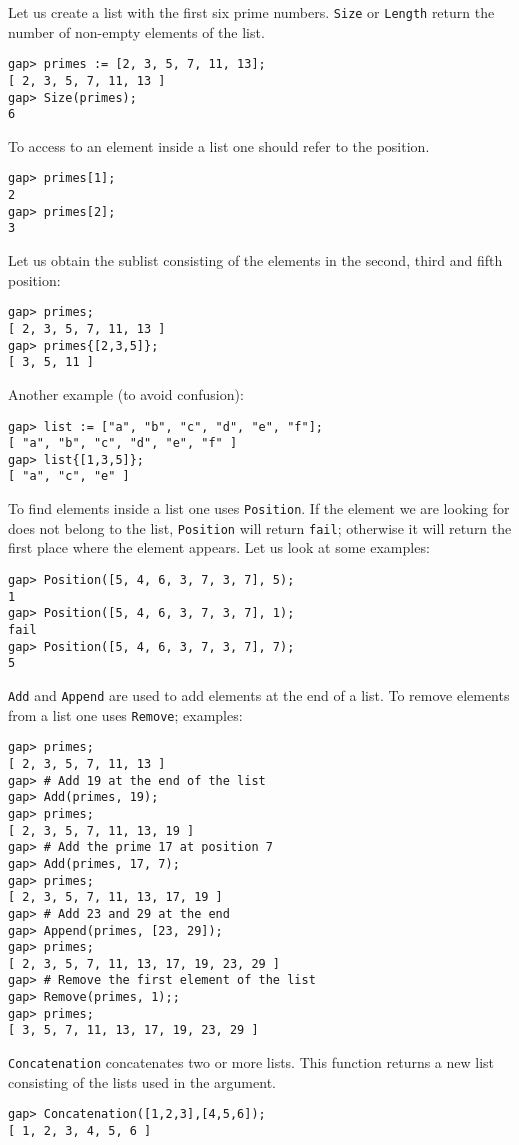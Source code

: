 \begin{example}
Let us create a list with the first six prime numbers. \lstinline{Size} or
\lstinline{Length} return the number of non-empty elements of the list. 
\begin{lstlisting}
gap> primes := [2, 3, 5, 7, 11, 13];
[ 2, 3, 5, 7, 11, 13 ]
gap> Size(primes);
6
\end{lstlisting}
To access to an element inside a list one should refer to the position. 
\begin{lstlisting}
gap> primes[1];
2
gap> primes[2];
3
\end{lstlisting}
Let us obtain the sublist consisting of the elements in the second, third and
fifth position:
\begin{lstlisting}
gap> primes;
[ 2, 3, 5, 7, 11, 13 ]
gap> primes{[2,3,5]};
[ 3, 5, 11 ]
\end{lstlisting}
Another example (to avoid confusion):
\begin{lstlisting}
gap> list := ["a", "b", "c", "d", "e", "f"];
[ "a", "b", "c", "d", "e", "f" ]
gap> list{[1,3,5]};
[ "a", "c", "e" ]
\end{lstlisting}
To find elements inside a list one uses \lstinline{Position}. If the element we
are looking for does not belong to the list, \lstinline{Position} will return
\lstinline{fail}; otherwise it will return the first place where the element
appears. Let us look at some examples:
\begin{lstlisting}
gap> Position([5, 4, 6, 3, 7, 3, 7], 5);
1
gap> Position([5, 4, 6, 3, 7, 3, 7], 1);
fail
gap> Position([5, 4, 6, 3, 7, 3, 7], 7);
5
\end{lstlisting}

\lstinline{Add} and \lstinline{Append} are used to add elements at the end of a
list. To remove elements from a list one uses \lstinline{Remove}; examples:
\begin{lstlisting}
gap> primes;
[ 2, 3, 5, 7, 11, 13 ]
gap> # Add 19 at the end of the list 
gap> Add(primes, 19);
gap> primes;
[ 2, 3, 5, 7, 11, 13, 19 ]
gap> # Add the prime 17 at position 7
gap> Add(primes, 17, 7); 
gap> primes;
[ 2, 3, 5, 7, 11, 13, 17, 19 ]
gap> # Add 23 and 29 at the end
gap> Append(primes, [23, 29]);
gap> primes;
[ 2, 3, 5, 7, 11, 13, 17, 19, 23, 29 ]
gap> # Remove the first element of the list
gap> Remove(primes, 1);;
gap> primes;
[ 3, 5, 7, 11, 13, 17, 19, 23, 29 ]
\end{lstlisting}
\end{example}

\lstinline{Concatenation} concatenates two or more lists. This function returns a new list 
consisting of the lists used in the argument. 
\begin{lstlisting}
gap> Concatenation([1,2,3],[4,5,6]);
[ 1, 2, 3, 4, 5, 6 ]
\end{lstlisting}


